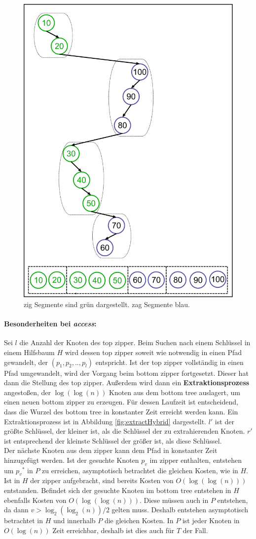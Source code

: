 \documentclass[a4paper,12pt]{article}
\begin{document}
\begin{figure}[H]
	\centering
	\includegraphics[height= 0.7\textwidth]{Medien/Zipper/preferredPathZigZag}
	\caption{zig Segmente sind grün dargestellt. zag Segmente blau. }
	\label{fig:preferredPathZigZag}
\end{figure}

\paragraph{Besonderheiten bei \textit{access}:}
Sei $l$ die Anzahl der Knoten des top zipper.
Beim Suchen nach einem Schlüssel in einem Hilfsbaum $H$ wird dessen top zipper soweit wie notwendig in einen Pfad gewandelt, der $\left(p_1, p_2, .., p_l\right)$ entspricht. Ist der top zipper vollständig in einen Pfad umgewandelt, wird der Vorgang beim bottom zipper fortgesetzt. Dieser hat dann die Stellung des top zipper. Außerdem wird dann ein \textbf{Extraktionsprozess} angestoßen, der $\log\left(\log\left(n\right)\right)$ Knoten aus dem bottom tree auslagert, um einen neuen bottom zipper zu erzeugen. Für dessen Laufzeit ist entscheidend, dass die Wurzel des bottom tree in konstanter Zeit erreicht werden kann. Ein Extraktionsprozess ist in Abbildung \ref{fig:extractHybrid} dargestellt. $l'$ ist der größte Schlüssel, der kleiner ist, als die Schlüssel der zu extrahierenden Knoten. $r'$ ist entsprechend der kleinste Schlüssel der größer ist, als diese Schlüssel.  \\
Der nächste Knoten aus dem zipper kann dem Pfad in konstanter Zeit hinzugefügt werden. Ist der gesuchte Knoten $p_v$  im zipper enthalten, entstehen um ${p_v}^*$ in  $P$ zu erreichen, asymptotisch betrachtet die gleichen Kosten, wie in $H$. Ist in $H$ der zipper aufgebracht, sind bereits Kosten von $O\left(\log\left(\log\left(n\right)\right)\right)$ entstanden. Befindet sich der gesuchte Knoten im  bottom tree entstehen in $H$ ebenfalls Kosten von  $O\left(\log\left(\log\left(n\right)\right)\right)$. Diese müssen auch in $P$ entstehen, da dann $v > \log_2\left(\log_2\left(n\right)\right) /2$  gelten muss. Deshalb entstehen asymptotisch betrachtet in $H$ und innerhalb $P$ die gleichen Kosten. In $P$ ist jeder Knoten in $O\left(\log\left(n\right)\right)$ Zeit erreichbar, deshalb ist dies auch für  $T$ der Fall. 
\end{document}
